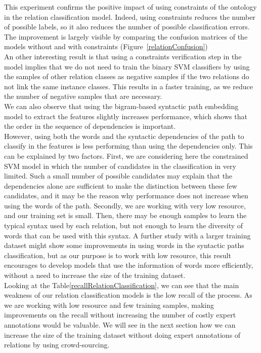 \documentclass[12pt]{article}
\begin{document}
This experiment confirms the positive impact of using constraints of the ontology in the relation classification model. Indeed, using constraints reduces the number of possible labels, so it also reduces the number of possible classification errors. The improvement is largely visible by comparing the confusion matrices of the models without and with constraints (Figure~\ref{relationConfusion})\\
An other interesting result is that using a constraints verification step in the model implies that we do not need to train the binary SVM classifiers by using the samples of other relation classes as negative samples if the two relations do not link the same instance classes. This results in a faster training, as we reduce the number of negative samples that are necessary.\\
We can also observe that using the bigram-based syntactic path embedding model to extract the features slightly increases performance, which shows that the order in the sequence of dependencies is important.\\
However, using both the words and the syntactic dependencies of the path to classify in the features is less performing than using the dependencies only. This can be explained by two factors. First, we are considering here the constrained SVM model in which the number of candidates in the classification in very limited. Such a small number of possible candidates may explain that the dependencies alone are sufficient to make the distinction between these few candidates, and it may be the reason why performance does not increase when using the words of the path. Secondly, we are working with very low resource, and our training set is small. Then, there may be enough samples to learn the typical syntax used by each relation, but not enough to learn the diversity of words that can be used with this syntax. A further study with a larger training dataset might show some improvements in using words in the syntactic paths classification, but as our purpose is to work with low resource, this result encourages to develop models that use the information of words more efficiently, without a need to increase the size of the training dataset.\\
Looking at the Table\ref{recallRelationClassification}, we can see that the main weakness of our relation classification models is the low recall of the process. As we are working with low resource and few training samples, making improvements on the recall without increasing the number of costly expert annotations would be valuable. We will see in the next section how we can increase the size of the training dataset without doing expert annotations of relations by using crowd-sourcing.\\
\end{document}

